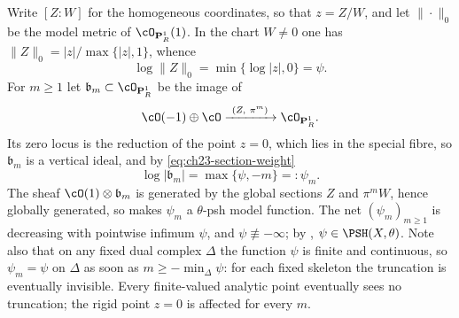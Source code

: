 \begin{example}
\label{ex:ch23-pole-model-check}
Write $[Z:W]$ for the homogeneous coordinates, so that $z=Z/W$, and let
$\|\cdot\|_0$ be the model metric of $\cO_{\mathbf P^1_R}(1)$.  In the
chart $W\ne0$ one has $\|Z\|_0=|z|/\max\{|z|,1\}$, whence
\begin{equation}\label{eq:ch23-section-weight}
 \log\|Z\|_0=\min\{\log|z|,0\}=\psi .
\end{equation}
For $m\geq1$ let $\mathfrak b_m\subset\cO_{\mathbf P^1_R}$ be the image
of
\[
 \cO(-1)\oplus\cO
 \xrightarrow{\ (Z,\ \pi^m)\ }
 \cO_{\mathbf P^1_R}.
\]
Its zero locus is the reduction of the point $z=0$, which lies in the
special fibre, so $\mathfrak b_m$ is a vertical ideal, and by
\eqref{eq:ch23-section-weight}
\begin{equation}\label{eq:ch23-truncated-pole}
 \log|\mathfrak b_m|=\max\{\psi,-m\}=:\psi_m .
\end{equation}
The sheaf $\cO(1)\otimes\mathfrak b_m$ is generated by the global sections
$Z$ and $\pi^mW$, hence globally generated, so
 makes $\psi_m$ a $\theta$-psh model
function.  The net $(\psi_m)_{m\geq1}$ is decreasing with pointwise
infimum $\psi$, and $\psi\not\equiv-\infty$; by
, $\psi\in\PSH(X,\theta)$.  Note also
that on any fixed dual complex $\Delta$ the function $\psi$ is finite and
continuous, so $\psi_m=\psi$ on $\Delta$ as soon as
$m\geq-\min_\Delta\psi$: for each fixed skeleton the truncation is eventually invisible.  Every
finite-valued analytic point eventually sees no truncation; the rigid
point $z=0$ is affected for every $m$.


\end{example}
